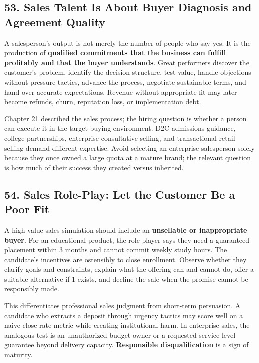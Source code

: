 \subsection*{53. Sales Talent Is About Buyer Diagnosis and Agreement Quality}

A salesperson's output is not merely the number of people who say yes. It is the production of \textbf{qualified commitments that the business can fulfill profitably and that the buyer understands}. Great performers discover the customer's problem, identify the decision structure, test value, handle objections without pressure tactics, advance the process, negotiate sustainable terms, and hand over accurate expectations. Revenue without appropriate fit may later become refunds, churn, reputation loss, or implementation debt.

Chapter 21 described the sales process; the hiring question is whether a person can execute it in the target buying environment. D2C admissions guidance, college partnerships, enterprise consultative selling, and transactional retail selling demand different expertise. Avoid selecting an enterprise salesperson solely because they once owned a large quota at a mature brand; the relevant question is how much of their success they created versus inherited.

\subsection*{54. Sales Role-Play: Let the Customer Be a Poor Fit}

A high-value sales simulation should include an \textbf{unsellable or inappropriate buyer}. For an educational product, the role-player says they need a guaranteed placement within 3 months and cannot commit weekly study hours. The candidate's incentives are ostensibly to close enrollment. Observe whether they clarify goals and constraints, explain what the offering can and cannot do, offer a suitable alternative if 1 exists, and decline the sale when the promise cannot be responsibly made.

This differentiates professional sales judgment from short-term persuasion. A candidate who extracts a deposit through urgency tactics may score well on a naive close-rate metric while creating institutional harm. In enterprise sales, the analogous test is an unauthorized budget owner or a requested service-level guarantee beyond delivery capacity. \textbf{Responsible disqualification} is a sign of maturity.

